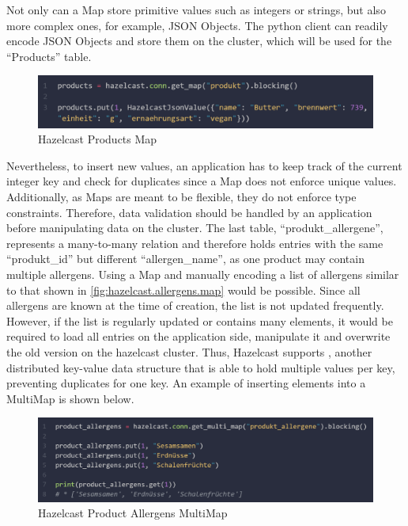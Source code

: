 Not only can a Map store primitive values such as integers or strings, but also more complex ones, for
example, JSON Objects. The python client can readily encode JSON Objects and store them on the cluster,
which will be used for the \enquote{Products} table.
\parencite{Hazelcast.PythonClient.HazelcastJsonValue}

\begin{figure}[H]
    \centering
    \caption{Hazelcast Products Map} \label{fig:hazelcast.products.map}
    \includegraphics[width=\textwidth]{images/hazelcast.products.map.png}
\end{figure}

Nevertheless, to insert new values, an application has to keep track of the current integer key and check
for duplicates since a Map does not enforce unique values. Additionally, as Maps are meant to be flexible,
they do not enforce type constraints. Therefore, data validation should be handled by an application before
manipulating data on the cluster.
The last table, \enquote{produkt\_allergene},
represents a many-to-many relation and therefore holds entries with the
same \enquote{produkt\_id} but different \enquote{allergen\_name}, as one product may contain multiple allergens.
Using a Map and manually encoding a list of allergens similar to that shown in \autoref{fig:hazelcast.allergens.map}
would be possible. Since all allergens are known at the time of creation, the
list is not updated frequently. However, if the list is regularly updated or contains many elements, it
would be required to load all entries on the application side, manipulate it and overwrite the old version
on the hazelcast cluster.
Thus, Hazelcast supports \textcite{Hazelcast.DataStructure.MultiMap}, another distributed key-value data structure that is able to hold
multiple values per key, preventing duplicates for one key.
An example of inserting elements into a MultiMap is shown below.

\begin{figure}[H]
    \centering
    \caption{Hazelcast Product Allergens MultiMap} \label{fig:hazelcast.product_allergens.1.multimap}
    \includegraphics[width=\textwidth]{images/hazelcast.product_allergens.multimap.1.png}
\end{figure}

